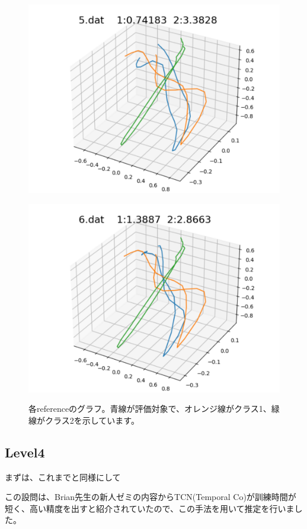 \begin{figure}[h]
\begin{minipage}[b]{0.32\linewidth}
  \includegraphics[keepaspectratio, scale=0.3]
  {./pic/level3/5_dat_l3.pdf}
  \label{5dat}
 \end{minipage}
  \begin{minipage}[b]{0.32\linewidth}
  \centering
  \includegraphics[keepaspectratio, scale=0.3]
  {./pic/level3/6_dat_l3.pdf}
  \label{6dat}
 \end{minipage}
 \caption{各referenceのグラフ。青線が評価対象で、オレンジ線がクラス1、緑線がクラス2を示しています。}\label{reg_poly}
\end{figure}

\newpage

\subsection*{Level4}
まずは、これまでと同様にして

この設問は、Brian先生の新人ゼミの内容からTCN(Temporal Co)が訓練時間が短く、高い精度を出すと紹介されていたので、この手法を用いて推定を行いました。
	
	
	

